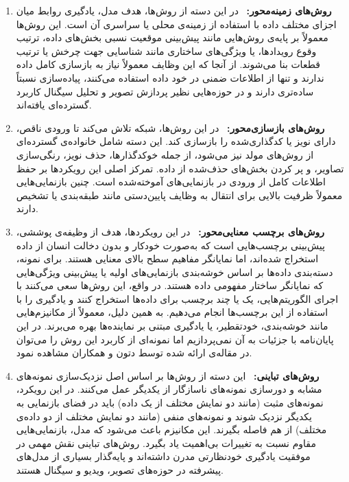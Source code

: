\begin{enumerate}

\item \textbf{روش‌های زمینه‌محور:} \
در این دسته از روش‌ها، هدف مدل، یادگیری روابط میان اجزای مختلف داده با استفاده از زمینه‌ی محلی یا سراسری آن است. این روش‌ها معمولاً بر پایه‌ی روش‌هایی مانند پیش‌بینی موقعیت نسبی بخش‌های داده، ترتیب وقوع رویدادها، یا ویژگی‌های ساختاری مانند شناسایی جهت چرخش یا ترتیب قطعات بنا می‌شوند. از آنجا که این وظایف معمولاً نیاز به بازسازی کامل داده ندارند و تنها از اطلاعات ضمنی در خود داده استفاده می‌کنند، پیاده‌سازی نسبتاً ساده‌تری دارند و در حوزه‌هایی نظیر پردازش تصویر و تحلیل سیگنال کاربرد گسترده‌ای یافته‌اند.

\item \textbf{روش‌های بازسازی‌محور:} \
در این روش‌ها، شبکه تلاش می‌کند تا ورودی ناقص، دارای نویز یا کدگذاری‌شده را بازسازی کند. این دسته شامل خانواده‌ی گسترده‌ای از روش‌های مولد
نیز می‌شود، از جمله خوکدگذارها، حذف نویز، رنگی‌سازی تصاویر، و پر کردن بخش‌های حذف‌شده از داده. تمرکز اصلی این رویکردها بر حفظ اطلاعات کامل از ورودی در بازنمایی‌های آموخته‌شده است. چنین بازنمایی‌هایی معمولاً ظرفیت بالایی برای انتقال به وظایف پایین‌دستی مانند طبقه‌بندی یا تشخیص دارند.

\item \textbf{روش‌های برچسب معنایی‌محور\LTRfootnote{Semantic Label-based}:} \
در این رویکردها، هدف از وظیفه‌ی پوششی، پیش‌بینی برچسب‌هایی است که به‌صورت خودکار و بدون دخالت انسان از داده استخراج شده‌اند، اما نمایانگر مفاهیم سطح بالای معنایی هستند. برای نمونه، دسته‌بندی داده‌ها بر اساس خوشه‌بندی بازنمایی‌های اولیه یا پیش‌بینی ویژگی‌هایی که نمایانگر ساختار مفهومی داده هستند. در واقع، این روش‌ها سعی می‌کنند با اجرای الگوریتم‌هایی، یک یا چند برچسب برای داده‌ها استخراج کنند و یادگیری را با استفاده از این برچسب‌ها انجام می‌دهیم. به همین دلیل، معمولاً از مکانیزم‌هایی مانند خوشه‌بندی، خودتقطیر،
یا یادگیری مبتنی بر نماینده‌ها بهره می‌برند. در این پایان‌نامه با جزئیات به آن نمی‌پردازیم اما نمونه‌ای از کاربرد این روش را می‌توان در مقاله‌ی ارائه شده توسط دتون و همکاران\cite{detone2018superpoint}
مشاهده نمود.

\item \textbf{روش‌های تباینی:} \
این دسته از روش‌ها بر اساس اصل نزدیک‌سازی نمونه‌های مشابه و دورسازی نمونه‌های ناسازگار از یکدیگر عمل می‌کنند. در این رویکرد، نمونه‌های مثبت (مانند دو نمایش
مختلف از یک داده) باید در فضای بازنمایی به یکدیگر نزدیک شوند و نمونه‌های منفی (مانند دو نمایش مختلف از دو داده‌ی مختلف) از هم فاصله بگیرند. این مکانیزم باعث می‌شود که مدل، بازنمایی‌هایی مقاوم نسبت به تغییرات بی‌اهمیت یاد بگیرد. روش‌های تباینی نقش مهمی در موفقیت یادگیری خودنظارتی مدرن داشته‌اند و پایه‌گذار بسیاری از مدل‌های پیشرفته در حوزه‌های تصویر، ویدیو و سیگنال هستند.

\end{enumerate}

